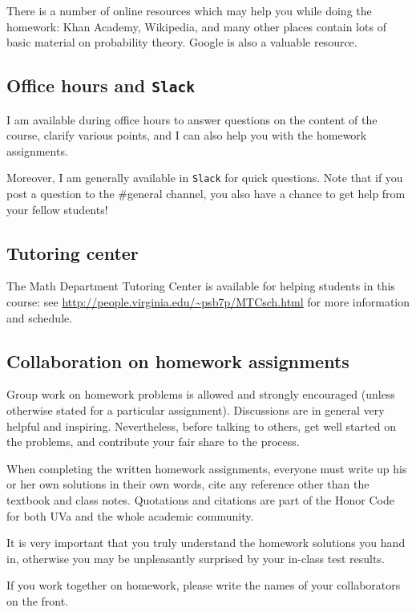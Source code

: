 \documentclass[oneside,11pt]{amsart}
\begin{document}
There is a number of online resources which may help you while doing the homework:
Khan Academy, Wikipedia, and many other 
places contain lots of basic material on probability theory. Google
is also a valuable resource.

\subsection{Office hours and \texttt{Slack}}

I am available during office hours to answer questions on the content of the 
course, clarify various points, and I can also help you with the homework assignments. 

Moreover, I am generally available in \texttt{Slack} for quick questions.
Note that if you post a question to the \#general channel, 
you also have a chance to get help from your fellow students!

\subsection{Tutoring center}

The Math Department Tutoring Center is available for helping students in this course: 
see \url{http://people.virginia.edu/~psb7p/MTCsch.html}
for more information and schedule. 

\subsection{Collaboration on homework assignments}
\label{collaboration}

Group work on homework problems is allowed and strongly encouraged (unless
otherwise stated for a particular assignment). Discussions are in general very
helpful and inspiring. Nevertheless, before talking to others, get well started
on the problems, and contribute your fair share to the process. 

When completing the written homework assignments, everyone must write up his or her own
solutions in their own words, cite any reference other than the textbook and
class notes. Quotations and citations are part of the Honor Code for both UVa
and the whole academic community. 

It is very important that you truly understand the homework solutions you hand
in, otherwise you may be unpleasantly surprised by your in-class test results.

If you work together on homework, please write the names of your collaborators
on the front.
\end{document}
